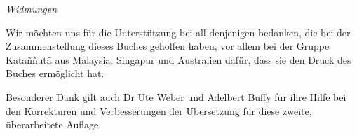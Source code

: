 \cleartoverso
\begin{quotepage}{80mm}
\centering
\emph{Widmungen}

Wir möchten uns für die Unterstützung bei all denjenigen bedanken, die bei der
Zusammenstellung dieses Buches geholfen haben, vor allem bei der Gruppe
Kataññutā aus Malaysia, Singapur und Australien dafür, dass sie den Druck des
Buches ermöglicht hat.

Besonderer Dank gilt auch Dr Ute Weber und Adelbert Buffy für ihre Hilfe bei den
Korrekturen und Verbesserungen der Übersetzung für diese zweite, überarbeitete
Auflage.

\end{quotepage}

